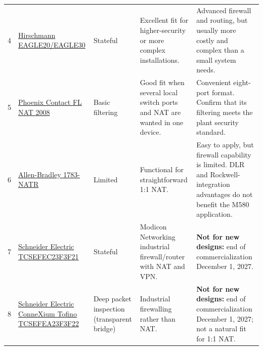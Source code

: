 \begin{longtable}{@{}P{0.65cm}P{3.47cm}P{2.50cm}P{4.23cm}P{5.23cm}@{}}
4 & \href{https://www.belden.com/products/networking-cybersecurity/industrial-cybersecurity/industrial-firewalls/eagle}{Hirschmann EAGLE20/EAGLE30} & Stateful & Excellent fit for higher-security or more complex installations. & Advanced firewall and routing, but usually more costly and complex than a small system needs. \\
5 & \href{https://www.phoenixcontact.com/en-us/products/nat-switch-fl-nat-2008-2702881}{Phoenix Contact FL NAT 2008} & Basic filtering & Good fit when several local switch ports and NAT are wanted in one device. & Convenient eight-port format. Confirm that its filtering meets the plant security standard. \\
6 & \href{https://www.rockwellautomation.com/en-us/products/hardware/allen-bradley/network-security-and-infrastructure/1783-natr.html}{Allen-Bradley 1783-NATR} & Limited & Functional for straightforward 1:1 NAT. & Easy to apply, but firewall capability is limited. DLR and Rockwell-integration advantages do not benefit the M580 application. \\
7 & \href{https://www.se.com/us/en/product/TCSEFEC23F3F21/}{Schneider Electric TCSEFEC23F3F21} & Stateful & Modicon Networking industrial firewall/router with NAT and VPN. & \textbf{Not for new designs:} end of commercialization December 1, 2027. \\
8 & \href{https://www.se.com/us/en/product/TCSEFEA23F3F22/}{Schneider Electric ConneXium Tofino TCSEFEA23F3F22} & Deep packet inspection (transparent bridge) & Industrial firewalling rather than NAT. & \textbf{Not for new designs:} end of commercialization December 1, 2027; not a natural fit for 1:1 NAT. \\
\bottomrule
\end{longtable}

